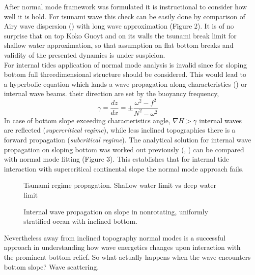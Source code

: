 After normal mode framework was formulated it is instructional to consider how well it is hold. For tsunami wave this check can be easily done by comparison of Airy wave dispersion (\cite{kundu2008fluid}) with long wave approximation (Figure 2). It is of no surprise that on top Koko Guoyt and on its walls the tsunami break limit for shallow water approximation, so that assumption on flat bottom breaks and validity of the presented dynamics is under suspicion.\\
For internal tides application of normal mode analysis is invalid since for sloping bottom full threedimensional structure should be considered. This would lead to a hyperbolic equation which lands a wave propagation along characteristics (\cite{sandstrom1969effect}) or internal wave beams. their direction are set by the buoyancy frequency,
\begin{equation}
\gamma = \frac{dz}{dx} = \pm \frac{\omega^2 - f^2}{N^2 - \omega^2}
\end{equation}
In case of bottom slope exceeding characteristics angle, $\nabla H > \gamma$ internal waves are reflected (\textit{supercritical regime}), while less inclined topographies there is a forward propagation (\textit{subcritical regime}). The analytical solution for internal wave propagation on sloping bottom was worked out previously (\cite{wunsch1968propagation}, \cite{wunsch1969progressive}) can be compared with normal mode fitting (Figure 3). This  establishes that for internal tide interaction with supercritical continental slope the normal mode approach fails. 

\begin{figure}
\caption{Tsunami regime propagation. Shallow water limit vs deep water limit}
\end{figure}

\begin{figure}
\caption{Internal wave propagation on slope in nonrotating, uniformly stratified ocean with inclined bottom.}
\end{figure}
Nevertheless away from inclined topography normal modes is a successful approach in understanding how wave energetics changes upon interaction with the prominent bottom relief. So what actually happens when the wave encounters bottom slope? Wave scattering.

